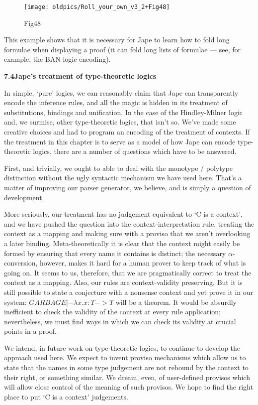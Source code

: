 \begin{figure}[htbp] \begin{center} \texttt{[image: oldpics/Roll\_your\_own\_v3\_2+Fig48]} \caption{Fig48} \end{center} \end{figure}


This example shows that it is necessary for Jape to learn how to fold long formulae when displaying a proof (it can fold long lists of formulae --- see, for example, the BAN logic encoding).


\textbf{{\large 7.4\tab Jape's treatment of type-theoretic logics}}


In simple, `pure' logics, we can reasonably claim that Jape can transparently encode the inference rules, and all the magic is hidden in its treatment of substitutions, bindings and unification. In the case of the Hindley-Milner logic and, we surmise, other type-theoretic logics, that isn't so. We've made some creative choices and had to program an encoding of the treatment of contexts. If the treatment in this chapter is to serve as a model of how Jape can encode type-theoretic logics, there are a number of questions which have to be answered.


First, and trivially, we ought to able to deal with the monotype / polytype distinction without the ugly syntactic mechanism we have used here. That's a matter of improving our parser generator, we believe, and is simply a question of development.


More seriously, our treatment has no judgement equivalent to `C is a context', and we have pushed the question into the context-interpretation rule, treating the context as a mapping and making sure with a proviso that we aren't overlooking a later binding. Meta-theoretically it is clear that the context might easily be formed by ensuring that every name it contains is distinct; the necessary \ensuremath{\alpha}-conversion, however, makes it hard for a human prover to keep track of what is going on. It seems to us, therefore, that we are pragmatically correct to treat the context as a mapping. Also, our rules are context-validity preserving. But it is still possible to state a conjecture with a nonsense context and yet prove it in our system: $GARBAGE |- \lambda x.x:T->T$ will be a theorem. It would be absurdly inefficient to check the validity of the context at every rule application; nevertheless, we must find ways in which we can check its validity at crucial points in a proof.


We intend, in future work on type-theoretic logics, to continue to develop the approach used here. We expect to invent proviso mechanisms which allow us to state that the names in some type judgement are not rebound by the context to their right, or something similar. We dream, even, of user-defined provisos which will allow close control of the meaning of such provisos. We hope to find the right place to put `C is a context' judgements.
 